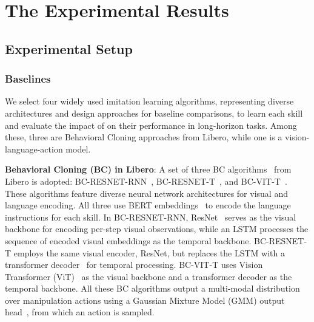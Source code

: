 \section{The \bm Experimental Results}
\label{sec:bm_results}

\subsection{Experimental Setup}



\subsubsection{Baselines}
\label{subsec:basic_bl}

We select four widely used imitation learning algorithms, representing diverse architectures and design approaches for baseline comparisons, to learn each skill and evaluate the impact of \pb on their performance in long-horizon tasks. Among these, three are Behavioral Cloning approaches from Libero, while one is a vision-language-action model.


\textbf{Behavioral Cloning (BC) in Libero}: A set of three BC algorithms~\cite{torabi2018behavioral} from Libero is adopted: BC-RESNET-RNN~\cite{mandlekar2021matters}, BC-RESNET-T~\cite{zhu2023viola}, and BC-VIT-T~\cite{kim2021vilt}. These algorithms feature diverse neural network architectures for visual and language encoding. All three use BERT embeddings~\cite{devlin2018bert} to encode the language instructions for each skill. In BC-RESNET-RNN, ResNet~\cite{he2016identity} serves as the visual backbone for encoding per-step visual observations, while an LSTM processes the sequence of encoded visual embeddings as the temporal backbone. BC-RESNET-T employs the same visual encoder, ResNet, but replaces the LSTM with a transformer decoder~\cite{vaswani2017attention} for temporal processing. BC-VIT-T uses Vision Transformer (ViT)~\cite{dosovitskiy2020image} as the visual backbone and a transformer decoder as the temporal backbone. All these BC algorithms output a multi-modal distribution over manipulation actions using a Gaussian Mixture Model (GMM) output head~\cite{bishop1994mixture}, from which an action is sampled.



